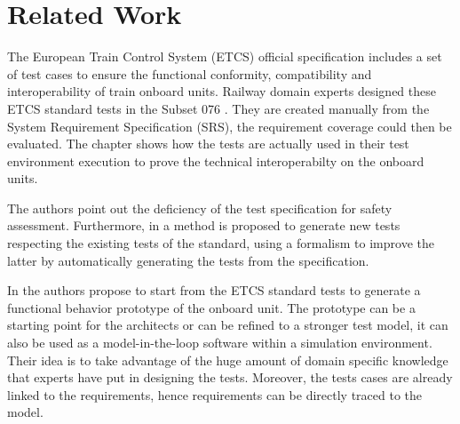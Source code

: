 \section{Related Work}
\label{sec:related}




 The European Train Control System (ETCS) official specification
includes a set of test cases to ensure the functional conformity,
compatibility and interoperability of train onboard units. Railway
domain experts designed these ETCS standard tests in the Subset 076
\cite{ETCS-Subset076}. They are created manually from the System Requirement
Specification (SRS), the requirement coverage could then be
evaluated. The chapter \cite{lars_ebrecht_verification_2012} shows how
the tests are actually used in their test environment execution to
prove the technical interoperabilty on the onboard units.

The authors \cite{Arriola_fault_2012} point out the deficiency of the
test specification for safety assessment. Furthermore, in
\cite{bonifacio_improvement_2011} a method  is proposed to generate new
tests respecting the existing tests of the standard, using a 
 formalism  to improve the latter
by automatically generating the tests from the specification.



In \cite{torens_inverse_2011,torens_starting_2011} the authors propose to start
from the ETCS standard tests  to generate a
functional behavior prototype of the onboard unit.  The prototype can be a
starting point for the architects or can be refined to a stronger test model, it
can also be used as a model-in-the-loop software within a simulation
environment.  Their idea is to take advantage of the huge amount of domain
specific knowledge that experts have put in designing the tests. Moreover, the
tests cases are already linked to the requirements, hence requirements can be
directly traced to the model.

